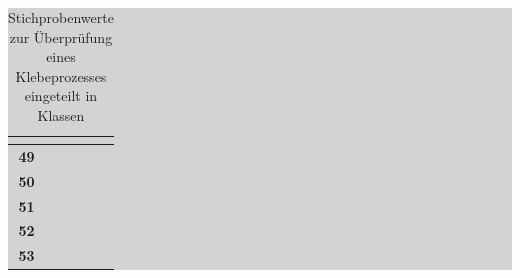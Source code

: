 \begin{table}[H]
\setlength{\arrayrulewidth}{.1em}
\caption{Stichprobenwerte zur \"{U}berpr\"{u}fung eines Klebeprozesses eingeteilt in Klassen}
\setlength{\fboxsep}{0pt}%
\colorbox{lightgray}{%
%
\begin{tabular}{| c | c | c | c | c |}
\hline
\parbox[c][0.6in][c]{1.2in}{\smallskip\centering\textbf{\selectfont{c / mg}}} & 
\parbox[c][0.6in][c]{1.2in}{\smallskip\centering\textbf{}} & 
\parbox[c][0.6in][c]{1.2in}{\smallskip\centering\textbf{\selectfont{Relative Häufigkeit h(c)}}} & 
\parbox[c][0.6in][c]{1.2in}{\smallskip\centering\textbf{}} & 
\parbox[c][0.6in][c]{1.2in}{\smallskip\centering\textbf{\selectfont{Relative Summenhäufigkeit H(c)}}}\\ \hline

\parbox[c][0.3in][c]{1.2in}{\centering\textbf{49}} & 
\parbox[c][0.3in][c]{1.2in}{} & 
\parbox[c][0.3in][c]{1.2in}{} & 
\parbox[c][0.3in][c]{1.2in}{} & 
\parbox[c][0.3in][c]{1.2in}{}\\ \hline

\parbox[c][0.3in][c]{1.2in}{\centering\textbf{50}} & 
\parbox[c][0.3in][c]{1.2in}{} & 
\parbox[c][0.3in][c]{1.2in}{} & 
\parbox[c][0.3in][c]{1.2in}{} & 
\parbox[c][0.3in][c]{1.2in}{}\\ \hline

\parbox[c][0.3in][c]{1.2in}{\centering\textbf{51}} & 
\parbox[c][0.3in][c]{1.2in}{} & 
\parbox[c][0.3in][c]{1.2in}{} & 
\parbox[c][0.3in][c]{1.2in}{} & 
\parbox[c][0.3in][c]{1.2in}{}\\ \hline

\parbox[c][0.3in][c]{1.2in}{\centering\textbf{52}} & 
\parbox[c][0.3in][c]{1.2in}{} & 
\parbox[c][0.3in][c]{1.2in}{} & 
\parbox[c][0.3in][c]{1.2in}{} & 
\parbox[c][0.3in][c]{1.2in}{}\\ \hline

\parbox[c][0.3in][c]{1.2in}{\centering\textbf{53}} & 
\parbox[c][0.3in][c]{1.2in}{} & 
\parbox[c][0.3in][c]{1.2in}{} & 
\parbox[c][0.3in][c]{1.2in}{} & 
\parbox[c][0.3in][c]{1.2in}{}\\ \hline

\end{tabular}%
}
\label{tab:threetwentyfour}
\end{table}


